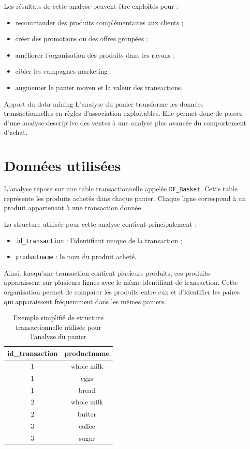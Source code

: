 \documentclass[12pt,a4paper,twoside]{report}
\begin{document}
Les résultats de cette analyse peuvent être exploités pour :
\begin{itemize}
  \item recommander des produits complémentaires aux clients ;
  \item créer des promotions ou des offres groupées ;
  \item améliorer l'organisation des produits dans les rayons ;
  \item cibler les campagnes marketing ;
  \item augmenter le panier moyen et la valeur des transactions.
\end{itemize}

\begin{resultbox}{Apport du data mining}
L'analyse du panier transforme les données transactionnelles en règles d'association exploitables. Elle permet donc de passer d'une analyse descriptive des ventes à une analyse plus avancée du comportement d'achat.
\end{resultbox}

\section{Données utilisées}

L'analyse repose sur une table transactionnelle appelée \texttt{DF\_Basket}. Cette table représente les produits achetés dans chaque panier. Chaque ligne correspond à un produit appartenant à une transaction donnée.

La structure utilisée pour cette analyse contient principalement :
\begin{itemize}
  \item \texttt{id\_transaction} : l'identifiant unique de la transaction ;
  \item \texttt{productname} : le nom du produit acheté.
\end{itemize}

Ainsi, lorsqu'une transaction contient plusieurs produits, ces produits apparaissent sur plusieurs lignes avec le même identifiant de transaction. Cette organisation permet de comparer les produits entre eux et d'identifier les paires qui apparaissent fréquemment dans les mêmes paniers.

\begin{table}[H]
\centering
{}
\begin{tabular}{cc}
\toprule
\rowcolor{TableHeader}
\color{white}\textbf{id\_transaction} & \color{white}\textbf{productname} \\
\midrule
1 & whole milk \\
1 & eggs \\
1 & bread \\
2 & whole milk \\
2 & butter \\
3 & coffee \\
3 & sugar \\
\bottomrule
\end{tabular}
\caption{Exemple simplifié de structure transactionnelle utilisée pour l'analyse du panier}
\label{tab:structure-basket}
\end{table}
\end{document}
